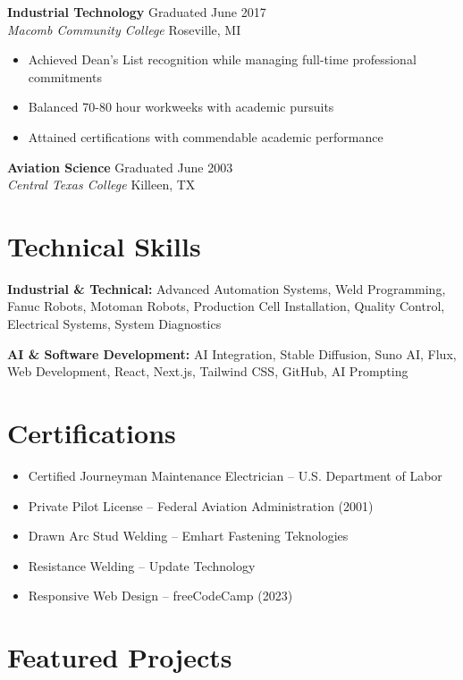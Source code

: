 \documentclass[11pt,letterpaper]{article}
\begin{document}
\textbf{Industrial Technology} \hfill Graduated June 2017\\
\textit{Macomb Community College} \textbullet{} Roseville, MI
\begin{itemize}
    \item Achieved Dean's List recognition while managing full-time professional commitments
    \item Balanced 70-80 hour workweeks with academic pursuits
    \item Attained certifications with commendable academic performance
\end{itemize}

\textbf{Aviation Science} \hfill Graduated June 2003\\
\textit{Central Texas College} \textbullet{} Killeen, TX

\section*{Technical Skills}

\textbf{Industrial \& Technical:} Advanced Automation Systems, Weld Programming, Fanuc Robots, Motoman Robots, Production Cell Installation, Quality Control, Electrical Systems, System Diagnostics

\textbf{AI \& Software Development:} AI Integration, Stable Diffusion, Suno AI, Flux, Web Development, React, Next.js, Tailwind CSS, GitHub, AI Prompting

\section*{Certifications}
\begin{itemize}
    \item Certified Journeyman Maintenance Electrician -- U.S. Department of Labor
    \item Private Pilot License -- Federal Aviation Administration (2001)
    \item Drawn Arc Stud Welding -- Emhart Fastening Teknologies
    \item Resistance Welding -- Update Technology
    \item Responsive Web Design -- freeCodeCamp (2023)
\end{itemize}

\section*{Featured Projects}
\end{document}
